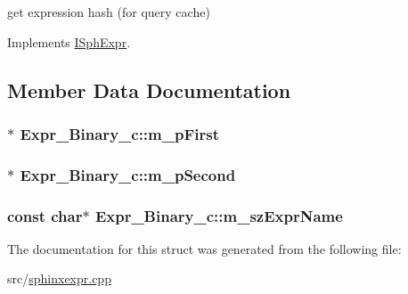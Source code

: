 get expression hash (for query cache) 



Implements \hyperlink{structISphExpr_aabc4c95ac6f190f6ebb15fabd7e54b08}{I\-Sph\-Expr}.



\subsection{Member Data Documentation}
\hypertarget{structExpr__Binary__c_a9b9bdea341afa4088699418b12006436}{
\subsubsection[{m\-\_\-p\-First}]{$\ast$ Expr\-\_\-\-Binary\-\_\-c\-::m\-\_\-p\-First}}\label{structExpr__Binary__c_a9b9bdea341afa4088699418b12006436}
\hypertarget{structExpr__Binary__c_a8b3d918c626b20c45f8562255a8b6c2c}{
\subsubsection[{m\-\_\-p\-Second}]{$\ast$ Expr\-\_\-\-Binary\-\_\-c\-::m\-\_\-p\-Second}}\label{structExpr__Binary__c_a8b3d918c626b20c45f8562255a8b6c2c}
\hypertarget{structExpr__Binary__c_a2ef9ef64fc8fae113cf5be3078743ae7}{
\subsubsection[{m\-\_\-sz\-Expr\-Name}]{\setlength{\rightskip}{0pt plus 5cm}const char$\ast$ Expr\-\_\-\-Binary\-\_\-c\-::m\-\_\-sz\-Expr\-Name}}\label{structExpr__Binary__c_a2ef9ef64fc8fae113cf5be3078743ae7}


The documentation for this struct was generated from the following file\-:\begin{DoxyCompactItemize}
\item 
src/\hyperlink{sphinxexpr_8cpp}{sphinxexpr.\-cpp}\end{DoxyCompactItemize}
